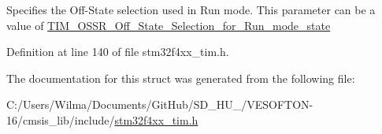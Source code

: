 Specifies the Off-\/\+State selection used in Run mode. This parameter can be a value of \hyperlink{group___t_i_m___o_s_s_r___off___state___selection__for___run__mode__state}{T\+I\+M\+\_\+\+O\+S\+S\+R\+\_\+\+Off\+\_\+\+State\+\_\+\+Selection\+\_\+for\+\_\+\+Run\+\_\+mode\+\_\+state} 

Definition at line 140 of file stm32f4xx\+\_\+tim.\+h.



The documentation for this struct was generated from the following file\+:\begin{DoxyCompactItemize}
\item 
C\+:/\+Users/\+Wilma/\+Documents/\+Git\+Hub/\+S\+D\+\_\+\+H\+U\+\_/\+V\+E\+S\+O\+F\+T\+O\+N-\/16/cmsis\+\_\+lib/include/\hyperlink{stm32f4xx__tim_8h}{stm32f4xx\+\_\+tim.\+h}\end{DoxyCompactItemize}
